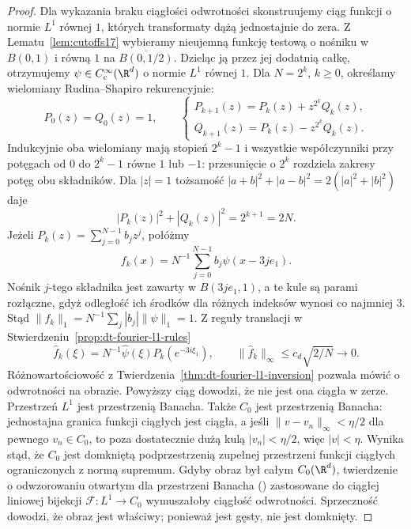 \begin{proof}
Dla wykazania braku ciągłości odwrotności skonstruujemy
ciąg funkcji o normie $L^1$ równej $1$, których transformaty
dążą jednostajnie do zera.
Z Lematu~\ref{lem:cutoffs17} wybieramy nieujemną
funkcję testową o nośniku w $B(0,1)$ i równą $1$ na
$\overline{B(0,1/2)}$. Dzieląc ją przez jej dodatnią
całkę, otrzymujemy $\psi\in C_c^\infty(\R^d)$ o normie
$L^1$ równej $1$. Dla $N=2^k$, $k\ge0$, określamy
wielomiany Rudina--Shapiro rekurencyjnie:
\[
 P_0(z)=Q_0(z)=1,\qquad
 \begin{cases}
 P_{k+1}(z)=P_k(z)+z^{2^k}Q_k(z),\\
 Q_{k+1}(z)=P_k(z)-z^{2^k}Q_k(z).
 \end{cases}
\]
Indukcyjnie oba wielomiany mają stopień $2^k-1$
i wszystkie współczynniki przy potęgach od $0$ do
$2^k-1$ równe $1$ lub $-1$:
przesunięcie o $2^k$ rozdziela zakresy potęg obu składników.
Dla $|z|=1$ tożsamość
$|a+b|^2+|a-b|^2=2(|a|^2+|b|^2)$ daje
\[
 |P_k(z)|^2+|Q_k(z)|^2=2^{k+1}=2N.
\]
Jeżeli $P_k(z)=\sum_{j=0}^{N-1}b_jz^j$,
połóżmy
\[
 f_k(x)=N^{-1}\sum_{j=0}^{N-1}b_j\psi(x-3je_1).
\]
Nośnik $j$-tego składnika jest zawarty w
$B(3je_1,1)$, a te kule są parami rozłączne,
gdyż odległość ich środków dla różnych indeksów
wynosi co najmniej $3$. Stąd
$\|f_k\|_1=N^{-1}\sum_j|b_j|\|\psi\|_1=1$.
Z reguły translacji w
Stwierdzeniu~\ref{prop:dt-fourier-l1-rules}
\[
 \widehat f_k(\xi)=N^{-1}\widehat\psi(\xi)
 P_k(e^{-3i\xi_1}),
 \qquad
 \|\widehat f_k\|_\infty\le c_d\sqrt{2/N}\longrightarrow0.
\]
Różnowartościowość z Twierdzenia~\ref{thm:dt-fourier-l1-inversion}
pozwala mówić o odwrotności na obrazie. Powyższy ciąg
dowodzi, że nie jest ona ciągła w zerze.
Przestrzeń $L^1$ jest przestrzenią Banacha.
Także $C_0$ jest przestrzenią Banacha: jednostajna
granica funkcji ciągłych jest ciągła, a jeśli
$\|v-v_n\|_\infty<\eta/2$ dla pewnego $v_n\in C_0$,
to poza dostatecznie dużą kulą $|v_n|<\eta/2$,
więc $|v|<\eta$. Wynika stąd, że $C_0$ jest domkniętą
podprzestrzenią zupełnej przestrzeni funkcji ciągłych
ograniczonych z normą supremum.
Gdyby obraz był całym $C_0(\R^d)$, twierdzenie
o odwzorowaniu otwartym dla przestrzeni Banacha
() zastosowane do ciągłej
liniowej bijekcji $\mathcal F:L^1\to C_0$ wymuszałoby
ciągłość odwrotności. Sprzeczność dowodzi, że obraz
jest właściwy; ponieważ jest gęsty, nie jest domknięty.
\end{proof}

